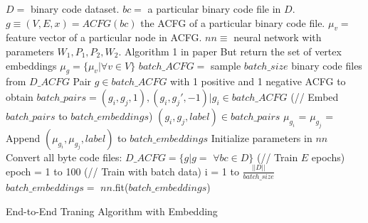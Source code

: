 \begin{algorithm}[h]
\DontPrintSemicolon
    \KwIn
    {
        $D = $ binary code dataset. \newline
        $bc = $ a particular binary code file in $D$. \newline
        $g \equiv (V, E, x) = ACFG(bc) $ the ACFG of a particular binary code file. \newline
        $\mu_v = $ feature vector of a particular node in ACFG. \newline
        $nn \equiv $ neural network with parameters $W_1, P_1, P_2, W_2$.
    }
     {
        Algorithm 1 in paper\;
        But return the set of vertex embeddings $\mu_g = \{\mu_v| \forall v \in V\}$\;
    }
     {
        $batch\_ACFG= $ sample $batch\_size$ binary code files from $D\_ACFG$\;
        Pair $g \in batch\_ACFG$ with 1 positive and 1 negative ACFG to obtain
        $batch\_pairs = {(g_i, g_j, 1), (g_i, g_j', -1) | g_i \in batch\_ACFG}$\;
        \ForEach (// Embed $batch\_pairs$ to $batch\_embeddings$) {$(g_i, g_j, label) \in batch\_pairs$} 
        {
            $\mu_{g_i}$ = \;
            $\mu_{g_j}$ = \;
            Append $(\mu_{g_i}, \mu_{g_j}, label)$ to $batch\_embeddings$\;
        }
    }
     {
        Initialize parameters in $nn$\;
        Convert all byte code files: $D\_{ACFG} = \{ g | g = $  $\forall bc \in D\}$\;
        \For (// Train $E$ epochs) {epoch = 1 to 100} {
            \For (// Train with batch data) {i = 1 to $\frac{||D||}{batch\_size}$} {
                $batch\_embeddings = $ \;
                $nn$.fit($batch\_embeddings$)\;
            }
        }
    }
\caption{End-to-End Traning Algorithm with Embedding}
\end{algorithm}
